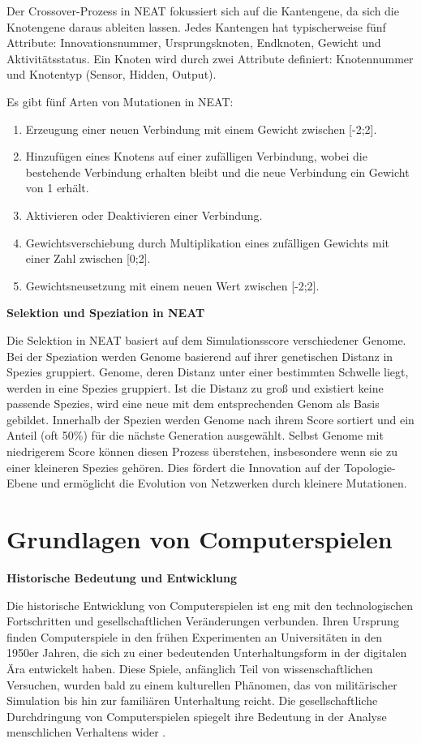 Der Crossover-Prozess in NEAT fokussiert sich auf die Kantengene, da sich die Knotengene daraus ableiten lassen. Jedes Kantengen hat typischerweise fünf Attribute: Innovationsnummer, Ursprungsknoten, Endknoten, Gewicht und Aktivitätsstatus. Ein Knoten wird durch zwei Attribute definiert: Knotennummer und Knotentyp (Sensor, Hidden, Output).

Es gibt fünf Arten von Mutationen in NEAT:
\begin{enumerate}
	\item Erzeugung einer neuen Verbindung mit einem Gewicht zwischen [-2;2].
	\item Hinzufügen eines Knotens auf einer zufälligen Verbindung, wobei die bestehende Verbindung erhalten bleibt und die neue Verbindung ein Gewicht von 1 erhält.
	\item Aktivieren oder Deaktivieren einer Verbindung.
	\item Gewichtsverschiebung durch Multiplikation eines zufälligen Gewichts mit einer Zahl zwischen [0;2].
	\item Gewichtsneusetzung mit einem neuen Wert zwischen [-2;2].
\end{enumerate}

\textbf{Selektion und Speziation in NEAT}

Die Selektion in NEAT basiert auf dem Simulationsscore verschiedener Genome. Bei der Speziation werden Genome basierend auf ihrer genetischen Distanz in Spezies gruppiert. Genome, deren Distanz unter einer bestimmten Schwelle liegt, werden in eine Spezies gruppiert. Ist die Distanz zu groß und existiert keine passende Spezies, wird eine neue mit dem entsprechenden Genom als Basis gebildet. Innerhalb der Spezien werden Genome nach ihrem Score sortiert und ein Anteil (oft 50\%) für die nächste Generation ausgewählt. Selbst Genome mit niedrigerem Score können diesen Prozess überstehen, insbesondere wenn sie zu einer kleineren Spezies gehören. Dies fördert die Innovation auf der Topologie-Ebene und ermöglicht die Evolution von Netzwerken durch kleinere Mutationen. 


\section{Grundlagen von Computerspielen}

\textbf{Historische Bedeutung und Entwicklung}

Die historische Entwicklung von Computerspielen ist eng mit den technologischen Fortschritten und gesellschaftlichen Veränderungen verbunden. Ihren Ursprung finden Computerspiele in den frühen Experimenten an Universitäten in den 1950er Jahren, die sich zu einer bedeutenden Unterhaltungsform in der digitalen Ära entwickelt haben. Diese Spiele, anfänglich Teil von wissenschaftlichen Versuchen, wurden bald zu einem kulturellen Phänomen, das von militärischer Simulation bis hin zur familiären Unterhaltung reicht. Die gesellschaftliche Durchdringung von Computerspielen spiegelt ihre Bedeutung in der Analyse menschlichen Verhaltens wider \cite{Huizinga1939}.

